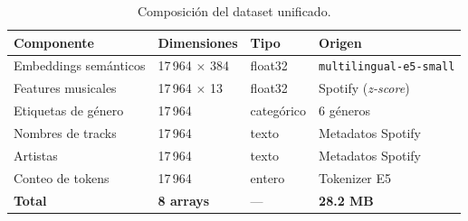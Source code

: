 \begin{table}[htbp]
\centering
\caption{Composición del dataset unificado.}
\label{tab:unified_summary}
\begin{tabular}{llll}
\toprule
Componente & Dimensiones & Tipo & Origen \\
\midrule
Embeddings semánticos & 17\,964 $\times$ 384 & float32 & \texttt{multilingual-e5-small} \\
Features musicales & 17\,964 $\times$ 13 & float32 & Spotify (\textit{z-score}) \\
Etiquetas de género & 17\,964 & categórico & 6 géneros \\
Nombres de tracks & 17\,964 & texto & Metadatos Spotify \\
Artistas & 17\,964 & texto & Metadatos Spotify \\
Conteo de tokens & 17\,964 & entero & Tokenizer E5 \\
\midrule
\textbf{Total} & \textbf{8 arrays} & --- & \textbf{28.2 MB} \\
\bottomrule
\end{tabular}
\end{table}